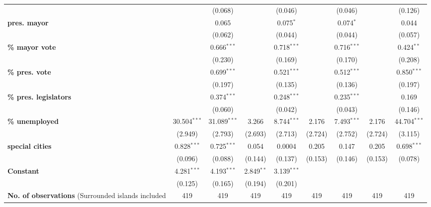 \begin{sidewaystable}[!htbp]
{\begin{threeparttable}
\begin{tabular}{lcccccccc}
                                  &               & (0.068)      &               & (0.046)      &               & (0.046)       &               & (0.126)\tabularnewline
\textbf{pres. mayor}                &               & 0.065        &               & 0.075$^{*}$  &               & 0.074$^{*}$   &               & 0.044\tabularnewline
                                  &               & (0.062)      &               & (0.044)      &               & (0.044)       &               & (0.057)\tabularnewline
\textbf{\% mayor vote}              &               & 0.666$^{***}$&               & 0.718$^{***}$&               & 0.716$^{***}$ &               & 0.424$^{**}$\tabularnewline
                                  &               & (0.230)      &               & (0.169)      &               & (0.170)       &               & (0.208)\tabularnewline
\textbf{\% pres. vote}              &               & 0.699$^{***}$&               & 0.521$^{***}$&               & 0.512$^{***}$ &               & 0.850$^{***}$\tabularnewline
                                  &               & (0.197)      &               & (0.135)      &               & (0.136)       &               & (0.197)\tabularnewline
\textbf{\% pres. legislators}       &               & 0.374$^{***}$&               & 0.248$^{***}$&               & 0.235$^{***}$ &               & 0.169\tabularnewline
                                  &               & (0.060)      &               & (0.042)      &               & (0.043)       &               & (0.146)\tabularnewline
\textbf{\% unemployed}              &30.504$^{***}$ &31.089$^{***}$& 3.266         & 8.744$^{***}$&2.176          & 7.493$^{***}$ & 2.176         & 44.704$^{***}$\tabularnewline
                                  & (2.949)       & (2.793)      & (2.693)       & (2.713)      & (2.724)       & (2.752)       & (2.724)       & (3.115)\tabularnewline
\textbf{special cities}             & 0.828$^{***}$ & 0.725$^{***}$& 0.054         & 0.0004       & 0.205         & 0.147         & 0.205         & 0.698$^{***}$\tabularnewline
                                  & (0.096)       & (0.088)      & (0.144)       & (0.137)      & (0.153)       & (0.146)       & (0.153)       & (0.078)\tabularnewline
\textbf{Constant}                      & 4.281$^{***}$ & 4.193$^{***}$& 2.849$^{**}$  & 3.139$^{***}$&               &               &               & \tabularnewline
                                  & (0.125)       & (0.165)      & (0.194)       & (0.201)      &               &               &               & \tabularnewline
\midrule 
\textbf{No. of observations} (Surrounded islands included     & 419        & 419        & 419      & 419      & 419         & 419         & 419          & 419\tabularnewline

\end{tabular}
\end{threeparttable}}
\end{sidewaystable}
